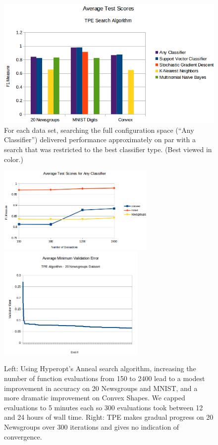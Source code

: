 \documentclass[wcp]{jmlr}
\begin{document}
\begin{figure}
    \centering
    \includegraphics[width=4.50in]{graphics/AverageTestScoresClassifiersTPE}
    \caption{
        For each data set, searching the full configuration space (``Any Classifier'') delivered performance approximately on par with a search that was restricted to the best classifier type.
        (Best viewed in color.)
    }
    \label{fig:avg_test_scores}
\end{figure}

\begin{figure}
    \centering
    \includegraphics[width=3.0in]{graphics/scores_by_classifier}
    \includegraphics[width=2.8in]{graphics/AvgMinValidErrorTPE}
    \caption{
	    Left: Using Hyperopt's Anneal search algorithm, increasing the number of function evaluations from 150 to 2400 lead to a modest improvement in accuracy on 20 Newsgroups and MNIST,
        and a more dramatic improvement on Convex Shapes.
        We capped evaluations to 5 minutes each so 300 evaluations took between 12 and 24 hours of wall time.
        Right: TPE makes gradual progress on 20 Newsgroups over 300 iterations and gives no indication of convergence.
    }
    \label{fig:per_clf}
\end{figure}
\end{document}
